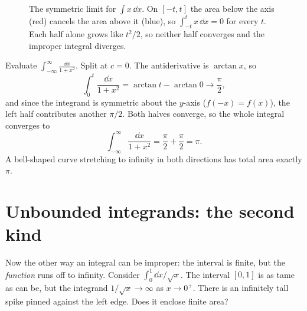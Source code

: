 \begin{figure}[htbp]
\centering
{}
\caption{The symmetric limit for $\int x\,\dd x$. On $[-t,t]$ the area below the
axis (red) cancels the area above it (blue), so $\int_{-t}^{t} x\,\dd x = 0$ for
every $t$. Each half alone grows like $t^2/2$, so neither half converges and the
improper integral diverges.}
\label{ch25:fig-principal-value}
\end{figure}

\begin{example}
\label{ch25:ex-arctan}
Evaluate $\displaystyle\int_{-\infty}^{\infty}\frac{\dd x}{1+x^2}$. Split at
$c=0$. The antiderivative is $\arctan x$, so
\[
  \int_0^{t}\frac{\dd x}{1+x^2} = \arctan t - \arctan 0 \to \frac{\pi}{2},
\]
and since the integrand is symmetric about the $y$-axis ($f(-x)=f(x)$), the left
half contributes another $\pi/2$.
Both halves converge, so the whole integral converges to
\[
  \int_{-\infty}^{\infty}\frac{\dd x}{1+x^2} = \frac{\pi}{2} + \frac{\pi}{2} = \pi.
\]
A bell-shaped curve stretching to infinity in both directions has total area
exactly $\pi$.
\end{example}

\section{Unbounded integrands: the second kind}
\label{ch25:second-kind}

Now the other way an integral can be improper: the interval is finite, but the
\emph{function} runs off to infinity. Consider $\int_0^1 \dd x/\sqrt{x}$. The
interval $[0,1]$ is as tame as can be, but the integrand $1/\sqrt{x}\to\infty$ as
$x\to 0^+$. There is an infinitely tall spike pinned against the left edge. Does
it enclose finite area?

